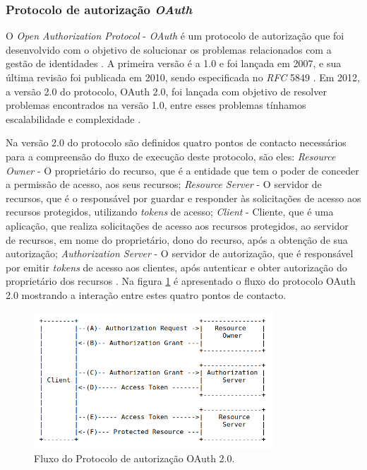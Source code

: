 \subsubsection{Protocolo de autorização \textit{OAuth}}
O \textit{Open Authorization Protocol} - \textit{OAuth} é um protocolo de autorização que foi desenvolvido com o objetivo de solucionar os problemas relacionados com a gestão de identidades \cite{leiba_oauth}.
 A primeira versão é a 1.0 e foi lançada em 2007, e sua última revisão foi publicada em 2010, sendo especificada no \textit{\gls{RFC}} 5849 \cite{oauth10}. Em 2012, a versão 2.0 do protocolo, OAuth 2.0, foi lançada com objetivo de resolver problemas encontrados
na versão 1.0, entre esses problemas tínhamos escalabilidade e complexidade \cite{oauth20}.
\par
Na versão 2.0 do protocolo são definidos quatro pontos de contacto necessários para a compreensão do fluxo de execução deste protocolo, são eles: \textit{Resource Owner} - O proprietário do recurso, que é a entidade que tem o poder de conceder a permissão de acesso, aos seus recursos; \textit{Resource Server} - O servidor de recursos, que é o responsável por guardar e responder às solicitações de acesso aos recursos protegidos, utilizando \textit{tokens} de acesso; \textit{Client} - Cliente, que é uma aplicação, que realiza solicitações de acesso aos recursos protegidos, ao servidor de recursos, em nome do proprietário, dono do recurso, após a obtenção de sua autorização; \textit{Authorization Server} - O servidor de autorização, que é responsável por emitir \textit{tokens} de acesso aos clientes, após autenticar e obter autorização do proprietário dos recursos \cite{oauth20}. Na figura \ref{f:oauth2flow} é apresentado o fluxo do protocolo OAuth 2.0 mostrando a interação entre estes quatro pontos de contacto.

\begin{figure}[H]
  \centering
  \includegraphics[width=0.8\textwidth]{imgs/oauth2flow.png}
  \caption[Fluxo do Protocolo 2.0]{Fluxo do Protocolo de autorização OAuth 2.0. \cite{oauth20}}
  \label{f:oauth2flow}
\end{figure}

